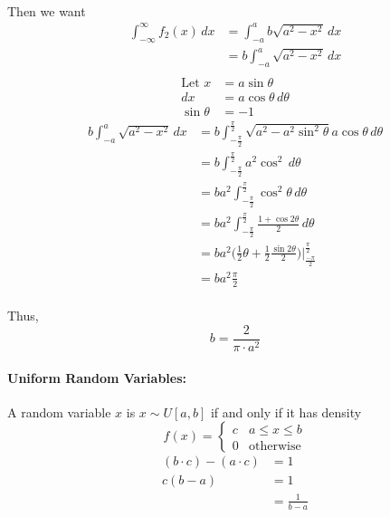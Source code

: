 \documentclass{article}
\begin{document}
\begin{enumerate}
        \paragraph{}Then we want 
        \begin{align*}
        \int_{-\infty}^{\infty} f_2(x) \, dx &= \int_{-a}^{a} b \sqrt{a^2-x^2}\,dx\\
                                             &= b \int_{-a}^{a} \sqrt{a^2-x^2}\,dx\\
        \end{align*}
        \begin{align*}
            \text{Let } x &= a\sin\theta\\
            dx &= a\cos\theta \, d\theta\\
            \sin\theta&= -1
        \end{align*}
        \begin{align*}
            b \int_{-a}^{a} \sqrt{a^2-x^2}\,dx &= b\int_{-\frac{\pi}{2}}^{\frac{\pi}{2}}\sqrt{a^2 - a^2\sin^2\theta} a\cos\theta\,d\theta\\
                                               &= b \int_{-\frac{\pi}{2}}^{\frac{\pi}{2}}a^2\cos^2\,d\theta\\
                                               &= ba^2 \int_{-\frac{\pi}{2}}^{\frac{\pi}{2}} \cos^2\theta\,d\theta\\
                                               &= ba^2 \int_{-\frac{\pi}{2}}^{\frac{\pi}{2}} \frac{1+\cos 2\theta}{2}\,d\theta\\
                                               &= ba^2 \bigg(\frac{1}{2}\theta + \frac{1}{2}\frac{\sin 2\theta}{2}\bigg)\big|_{\frac{-\pi}{2}}^{\frac{\pi}{2}}\\
                                               &= ba^2 \frac{\pi}{2}
        \end{align*}
        \paragraph{}Thus,
        \[
            b = \frac{2}{\pi\cdot a^2} 
        \]
\end{enumerate}
\paragraph{Uniform Random Variables:} A random variable $x$ is $x \sim U[a,b]$ if and only if it has density
\[ f(x) = \begin{cases}
    c & a \le x \le b \\
    0 & \text{otherwise}
    \end{cases}
\]
\begin{align*}
    (b\cdot c)-(a\cdot c) &= 1\\
    c(b-a) &= 1\\
           &= \frac{1}{b-a}
\end{align*}
\end{document}
